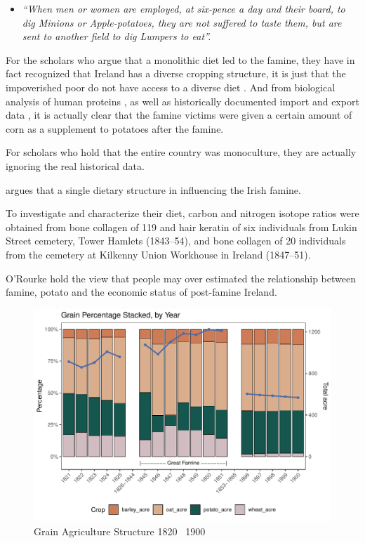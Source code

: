 \begin{itemize}
    \item [] \textit{``When men or women are employed, at six-pence a day and their board, to dig Minions or Apple-potatoes, they are not suffered to taste them, but are sent to another field to dig Lumpers to eat''.}\citep{grada1995ireland}
\end{itemize}

For the scholars who argue that a monolithic diet led to the famine, they have in fact recognized that Ireland has a diverse cropping structure, it is just that the impoverished poor do not have access to a diverse diet \citep{braa1997great, nally2008coming, de1998famine, kinealy2006great}. And from biological analysis of human proteins \citep{beaumont2014isotopic, beaumont2013victims}, as well as historically documented import and export data \citep{fairlie1965nineteenth}, it is actually clear that the famine victims were given a certain amount of corn as a supplement to potatoes after the famine.

For scholars who hold that the entire country was monoculture, they are actually ignoring the real historical data.



argues that a single dietary structure in influencing the Irish famine.\citep{}


To investigate and characterize their diet, carbon and nitrogen isotope ratios were obtained from bone collagen of 119 and hair keratin of six individuals from Lukin Street cemetery, Tower Hamlets (1843–54), and bone collagen of 20 individuals from the cemetery at Kilkenny Union Workhouse in Ireland (1847–51).\citep{beaumont2013victims}

O'Rourke hold the view that people may over estimated the relationship between famine, potato and the economic status of post-famine Ireland\citep{o1994economic}.


\begin{figure}[htbp]
    \centering
    \caption{Grain Agriculture Structure 1820 \textendash\ 1900}
    \includegraphics[width=.95\textwidth]{../03_outputs/food_structure.pdf}
\end{figure}

